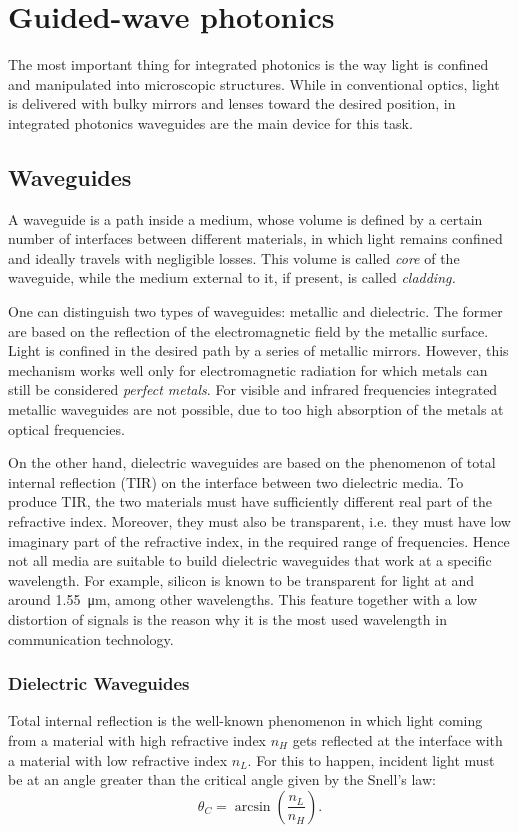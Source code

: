 \section{Guided-wave photonics}
\label{sec:guided-wave_photonics}
The most important thing for integrated photonics is the way light is confined and manipulated into microscopic structures.
While in conventional optics, light is delivered with bulky mirrors and lenses toward the desired position, in integrated photonics waveguides are the main device for this task.

\subsection{Waveguides}
\label{ssec:waveguides}
A waveguide is a path inside a medium, whose volume is defined by a certain number of interfaces between different materials, in which light remains confined and ideally travels with negligible losses.
This volume is called \textit{core} of the waveguide, while the medium external to it, if present, is called \textit{cladding.}

One can distinguish two types of waveguides: metallic and dielectric.
The former are based on the reflection of the electromagnetic field by the metallic surface.
Light is confined in the desired path by a series of metallic mirrors.
However, this mechanism works well only for electromagnetic radiation for which metals can still be considered \textit{perfect metals}.
For visible and infrared frequencies integrated metallic waveguides are not possible, due to too high absorption of the metals at optical frequencies.

On the other hand, dielectric waveguides are based on the phenomenon of total internal reflection (TIR) on the interface between two dielectric media.
To produce TIR, the two materials must have sufficiently different real part of the refractive index.
Moreover, they must also be transparent, i.e. they must have low imaginary part of the refractive index, in the required range of frequencies.
Hence not all media are suitable to build dielectric waveguides that work at a specific wavelength.
For example, silicon is known to be transparent for light at and around \SI{1.55}{\um}, among other wavelengths.
This feature together with a low distortion of signals is the reason why it is the most used wavelength in communication technology.

\subsubsection{Dielectric Waveguides}
\label{sssec:Dielectric_Waveguides}
Total internal reflection is the well-known phenomenon in which light coming from a material with high refractive index $n_H$ gets reflected at the interface with a material with low refractive index $n_L$.
For this to happen, incident light must be at an angle greater than the critical angle given by the Snell's law:
\begin{equation*}
	\theta_C = \arcsin \left( \dfrac{n_L}{n_H}\right).
\end{equation*}

